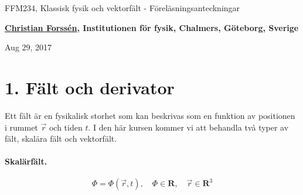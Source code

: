 \documentclass[%
oneside,                 %
final,                   %
10pt]{article}
\begin{document}

\newcommand{\exercisesection}[1]{\subsection*{#1}}







\thispagestyle{empty}

\begin{center}
{\LARGE\bf
\begin{spacing}{1.25}
FFM234, Klassisk fysik och vektorfält - Föreläsningsanteckningar
\end{spacing}
}
\end{center}


\begin{center}
{\bf \href{{http://fy.chalmers.se/subatom/tsp/}}{Christian Forssén}, Institutionen för fysik, Chalmers, Göteborg, Sverige${}^{}$} \\ [0mm]
\end{center}

\begin{center}
\end{center}
    

\begin{center}
Aug 29, 2017
\end{center}

\vspace{1cm}


\section{1. Fält och derivator}

Ett fält är en fysikalisk storhet som kan beskrivas som en funktion av
positionen i rummet $\vec{r}$ och tiden $t$.  I den här kursen kommer vi
att behandla två typer av fält, skalära fält och vektorfält.

\paragraph{Skalärfält.}
\begin{equation}
\Phi = \Phi(\vec{r},t), \quad \Phi \in \mathbf{R},\quad \vec{r} \in \mathbf{R}^3
\end{equation}
\end{document}
